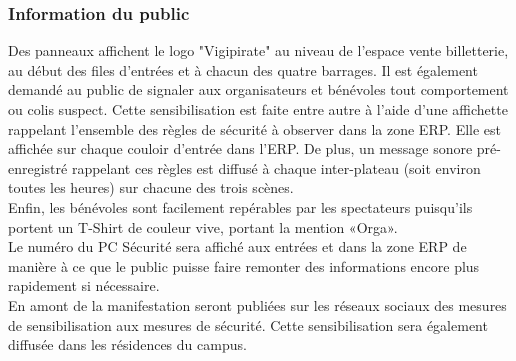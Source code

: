 \documentclass[hidelinks, paper=a4, fontsize=13pt]{report}
\begin{document}
\subsubsection{Information du public}
Des panneaux affichent le logo "Vigipirate" au niveau de l'espace vente billetterie, au début des files d'entrées et à chacun des quatre barrages. Il est également demandé au public de signaler aux organisateurs et bénévoles tout comportement ou colis suspect. Cette sensibilisation est faite entre autre à l'aide d'une affichette rappelant l’ensemble des règles de sécurité à observer dans la zone ERP. Elle est affichée sur chaque couloir d’entrée dans l’ERP. De plus, un message sonore pré-enregistré rappelant ces règles est diffusé à chaque inter-plateau (soit environ toutes les heures) sur chacune des trois scènes.\\

Enfin, les bénévoles sont facilement repérables par les spectateurs puisqu’ils portent un T-Shirt de couleur vive, portant la mention «Orga». \\
Le numéro du PC Sécurité sera affiché aux entrées et dans la zone ERP de manière à ce que le public puisse faire remonter des informations encore plus rapidement si nécessaire. \\

En amont de la manifestation seront publiées sur les réseaux sociaux des mesures de sensibilisation aux mesures de sécurité. Cette sensibilisation sera également diffusée dans les résidences du campus.
\end{document}
